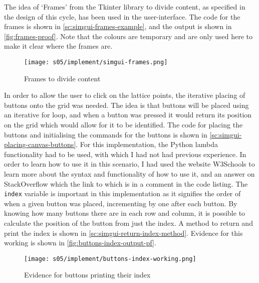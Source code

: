     The idea of `Frames' from the Tkinter library to divide content, as specified in the design of this cycle, has been used in the user-interface. 
    The code for the frames is shown in \autoref{sc:simgui-frames-example}, and the output is shown in \autoref{fig:frames-proof}. 
    Note that the colours are temporary and are only used here to make it clear where the frames are. 

    \begin{figure}[!ht]
        \centering
        \texttt{[image: s05/implement/simgui-frames.png]}
        \caption{Frames to divide content}
        \label{fig:frames-proof}
    \end{figure}



    In order to allow the user to click on the lattice points, the iterative placing of buttons onto the grid was needed. 
    The idea is that buttons will be placed using an iterative for loop, and when a button was pressed it would return its position on the grid which would allow for it to be identified. 
    The code for placing the buttons and initialising the commands for the buttons is shown in \autoref{sc:simgui-placing-canvas-buttons}.
    For this implementation, the Python lambda functionality had to be used, with which I had not had previous experience. 
    In order to learn how to use it in this scenario, I had used the website W3Schools to learn more about the syntax and functionality of how to use it, and an answer on StackOverflow which the link to which is in a comment in the code listing. 
    The \verb|index| variable is important in this implementation as it signifies the order of when a given button was placed, incrementing by one after each button. 
    By knowing how many buttons there are in each row and column, it is possible to calculate the position of the button from just the index. 
    A method to return and print the index is shown in \autoref{sc:simgui-return-index-method}.
    Evidence for this working is shown in \autoref{fig:buttons-index-output-pf}. 

    \begin{figure}[!ht]
        \centering
        \texttt{[image: s05/implement/buttons-index-working.png]}
        \caption{Evidence for buttons printing their index}
        \label{fig:buttons-index-output-pf}
    \end{figure}

